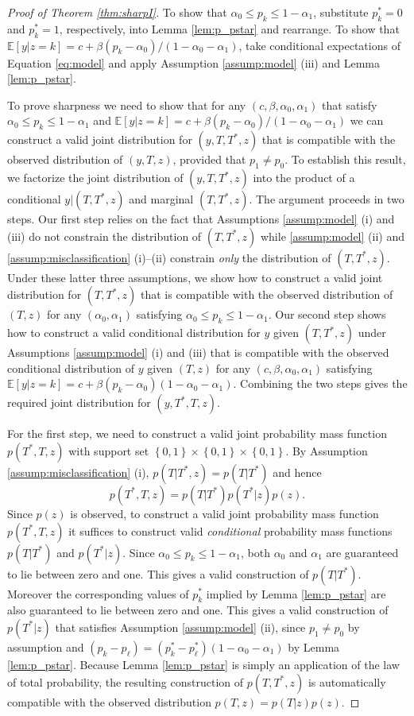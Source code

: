 \begin{proof}[Proof of Theorem \ref{thm:sharpI}]
  To show that $\alpha_0 \leq p_k \leq 1 - \alpha_1$,  substitute $p_k^*=0$ and $p_k^*=1$, respectively, into Lemma \ref{lem:p_pstar} and rearrange.
  To show that $\mathbb{E}[y|z=k] = c + \beta(p_k - \alpha_0) / (1 - \alpha_0 - \alpha_1)$, take conditional expectations of Equation \ref{eq:model} and apply Assumption \ref{assump:model} (iii) and Lemma \ref{lem:p_pstar}.

To prove sharpness we need to show that for any $(c,\beta, \alpha_0, \alpha_1)$ that satisfy $\alpha_0 \leq p_k \leq 1 - \alpha_1$ and $\mathbb{E}[y|z=k] = c + \beta(p_k - \alpha_0)/(1 - \alpha_0 - \alpha_1)$  we can construct a valid joint distribution for $(y,T,T^*,z)$ that is compatible with the observed distribution of $(y,T,z)$, provided that $p_1 \neq p_0$.
To establish this result, we factorize the joint distribution of $(y,T,T^*,z)$ into the product of a conditional $y|(T,T^*,z)$ and marginal $(T,T^*,z)$.
The argument proceeds in two steps.
Our first step relies on the fact that Assumptions \ref{assump:model} (i) and (iii) do not constrain the distribution of $(T,T^*,z)$ while \ref{assump:model} (ii) and \ref{assump:misclassification} (i)--(ii) constrain \emph{only} the distribution of $(T,T^*,z)$.
Under these latter three assumptions, we show how to construct a valid joint distribution for $(T,T^*,z)$ that is compatible with the observed distribution of $(T,z)$ for any $(\alpha_0,\alpha_1)$ satisfying $\alpha_0 \leq p_k \leq 1 - \alpha_1$.
Our second step shows how to construct a valid conditional distribution for $y$ given $(T,T^*,z)$ under Assumptions \ref{assump:model} (i) and (iii) that is compatible with the observed conditional distribution of $y$ given $(T,z)$ for any $(c,\beta,\alpha_0, \alpha_1)$ satisfying $\mathbb{E}[y|z=k] = c + \beta (p_k - \alpha_0)(1 - \alpha_0 - \alpha_1)$.
Combining the two steps gives the required joint distribution for $(y,T^*,T,z)$.

For the first step, we need to construct a valid joint probability mass function $p(T^*,T,z)$ with support set $\left\{ 0,1 \right\} \times \left\{ 0,1 \right\} \times \left\{ 0,1 \right\}$.
 By Assumption \ref{assump:misclassification} (i), $p(T|T^*,z) = p(T|T^*)$ and hence 
\[
  p(T^*,T,z) = p(T|T^*)p(T^*|z)p(z).
\]
Since $p(z)$ is observed, to construct a valid joint probability mass function $p(T^*,T,z)$ it suffices to construct valid \emph{conditional} probability mass functions $p(T|T^*)$ and $p(T^*|z)$.
Since $\alpha_0 \leq p_k \leq 1 - \alpha_1$, both $\alpha_0$ and $\alpha_1$ are guaranteed to lie between zero and one.
This gives a valid construction of $p(T|T^*)$.
Moreover the corresponding values of $p_k^*$ implied by Lemma \ref{lem:p_pstar} are also guaranteed to lie between zero and one.
This gives a valid construction of $p(T^*|z)$ that satisfies Assumption \ref{assump:model} (ii), since $p_1 \neq p_0$ by assumption and $(p_k - p_\ell) = (p_k^* - p_\ell^*)(1 - \alpha_0 - \alpha_1)$ by Lemma \ref{lem:p_pstar}.
Because Lemma \ref{lem:p_pstar} is simply an application of the law of total probability, the resulting construction of $p(T,T^*,z)$ is automatically compatible with the observed distribution $p(T,z) = p(T|z)p(z)$.


\end{proof}
